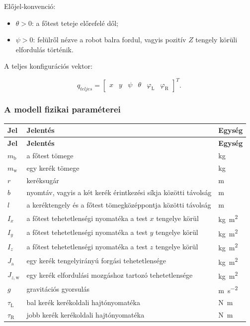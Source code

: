 \documentclass[12pt,a4paper]{report}
\newcommand{\mbody}{m_{\mathrm{b}}}
\newcommand{\mwheel}{m_{\mathrm{w}}}
\newcommand{\Jspin}{J_{\mathrm{a}}}
\newcommand{\Jzw}{J_{z,\mathrm{w}}}
\newcommand{\tauL}{\tau_{\mathrm{L}}}
\newcommand{\tauR}{\tau_{\mathrm{R}}}
\newcommand{\phiL}{\varphi_{\mathrm{L}}}
\newcommand{\phiR}{\varphi_{\mathrm{R}}}
\begin{document}
	Előjel-konvenció:
	
	\begin{itemize}[leftmargin=2em]
		\item $\theta>0$: a főtest teteje előrefelé dől;
		\item $\psi>0$: felülről nézve a robot balra fordul, vagyis pozitív $Z$ tengely körüli elfordulás történik.
	\end{itemize}
	
	A teljes konfigurációs vektor:
	
	\begin{equation}
		q_{teljes} = \begin{bmatrix}
			x & y & \psi & \theta & \phiL & \phiR
		\end{bmatrix}^{\!T}.
	\end{equation}
	
	\newpage
	
	\subsubsection{A modell fizikai paraméterei}
	
	\renewcommand{\arraystretch}{1.4}
	
	\begin{longtable}{>{\centering\arraybackslash}p{2.5cm} p{8cm} p{2.5cm}}
		\toprule
		\textbf{Jel} & \textbf{Jelentés} & \textbf{Egység} \\
		\midrule
		\endfirsthead
		\toprule
		\textbf{Jel} & \textbf{Jelentés} & \textbf{Egység} \\
		\midrule
		\endhead
		$\mbody$ & a főtest tömege & \si{kg} \\ \hline
		$\mwheel$ & egy kerék tömege & \si{kg} \\ \hline
		$r$ & keréksugár & \si{m} \\ \hline
		$b$ & nyomtáv, vagyis a két kerék érintkezési síkja közötti távolság & \si{m} \\ \hline
		$l$ & a keréktengely és a főtest tömegközéppontja közötti távolság & \si{m} \\ \hline
		$I_x$ & a főtest tehetetlenségi nyomatéka a test $x$ tengelye körül & \si{kg.m^2} \\ \hline
		$I_y$ & a főtest tehetetlenségi nyomatéka a test $y$ tengelye körül & \si{kg.m^2} \\ \hline
		$I_z$ & a főtest tehetetlenségi nyomatéka a test $z$ tengelye körül & \si{kg.m^2} \\ \hline
		$\Jspin$ & egy kerék tengelyirányú forgási tehetetlensége & \si{kg.m^2} \\ \hline
		$\Jzw$ & egy kerék elfordulási mozgáshoz tartozó tehetetlensége & \si{kg.m^2} \\ \hline
		$g$ & gravitációs gyorsulás & \si{m.s^{-2}} \\ \hline
		$\tauL$ & bal kerék kerékoldali hajtónyomatéka & \si{N.m} \\ \hline
		$\tauR$ & jobb kerék kerékoldali hajtónyomatéka & \si{N.m} \\
		\bottomrule
	\end{longtable}
	
\end{document}
